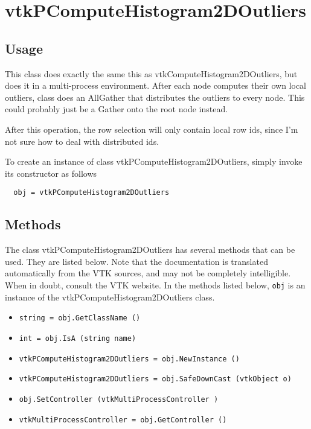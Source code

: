 \section{vtkPComputeHistogram2DOutliers}

\subsection{Usage}

  This class does exactly the same this as vtkComputeHistogram2DOutliers,
  but does it in a multi-process environment.  After each node
  computes their own local outliers, class does an AllGather
  that distributes the outliers to every node.  This could probably just
  be a Gather onto the root node instead.

  After this operation, the row selection will only contain local row ids,
  since I'm not sure how to deal with distributed ids.


To create an instance of class vtkPComputeHistogram2DOutliers, simply
invoke its constructor as follows
\begin{verbatim}
  obj = vtkPComputeHistogram2DOutliers
\end{verbatim}
\subsection{Methods}

The class vtkPComputeHistogram2DOutliers has several methods that can be used.
  They are listed below.
Note that the documentation is translated automatically from the VTK sources,
and may not be completely intelligible.  When in doubt, consult the VTK website.
In the methods listed below, \verb|obj| is an instance of the vtkPComputeHistogram2DOutliers class.
\begin{itemize}
\item  \verb|string = obj.GetClassName ()|

\item  \verb|int = obj.IsA (string name)|

\item  \verb|vtkPComputeHistogram2DOutliers = obj.NewInstance ()|

\item  \verb|vtkPComputeHistogram2DOutliers = obj.SafeDownCast (vtkObject o)|

\item  \verb|obj.SetController (vtkMultiProcessController )|

\item  \verb|vtkMultiProcessController = obj.GetController ()|

\end{itemize}
